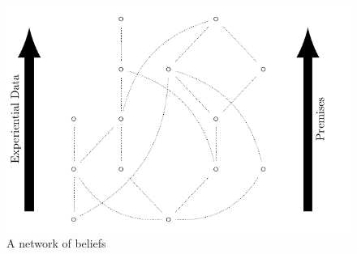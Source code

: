 \documentclass[11pt,titlepage]{report}
\numberwithin{equation}{subsection}
\begin{document}
\begin{figure}[ht]
\begin{center}
\includegraphics[]{poset/poset2.pdf}
\end{center}
\caption{A network of beliefs}
\label{fig:poset}
\end{figure}


\end{document}
